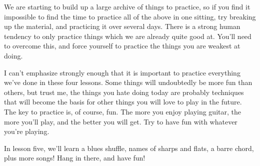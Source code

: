 %
We are starting to build up a large archive of things to practice, so if you
find it impossible to find the time to practice all of the above in one
sitting, try breaking up the material, and practicing it over several days.
There is a strong human tendency to only practice things which we are already
quite good at. You'll need to overcome this, and force yourself to practice the
things you are weakest at doing.

I can't emphasize strongly enough that it is important to practice everything
we've done in these four lessons. Some things will undoubtedly be more fun than
others, but trust me, the things you hate doing today are probably techniques
that will become the basis for other things you will love to play in the
future. The key to practice is, of course, fun. The more you enjoy playing
guitar, the more you'll play, and the better you will get. Try to have fun with
whatever you're playing.

In lesson five, we'll learn a blues shuffle, names of sharps and flats, a barre
chord, plus more songs! Hang in there, and have fun!

